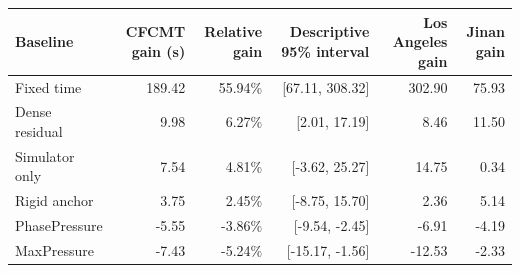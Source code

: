 \begin{tabular}{lrrrrr}
\toprule
Baseline & CFCMT gain (s) & Relative gain & Descriptive 95\% interval & Los Angeles gain & Jinan gain \\
\midrule
Fixed time & 189.42 & 55.94\% & [67.11, 308.32] & 302.90 & 75.93 \\
Dense residual & 9.98 & 6.27\% & [2.01, 17.19] & 8.46 & 11.50 \\
Simulator only & 7.54 & 4.81\% & [-3.62, 25.27] & 14.75 & 0.34 \\
Rigid anchor & 3.75 & 2.45\% & [-8.75, 15.70] & 2.36 & 5.14 \\
PhasePressure & -5.55 & -3.86\% & [-9.54, -2.45] & -6.91 & -4.19 \\
MaxPressure & -7.43 & -5.24\% & [-15.17, -1.56] & -12.53 & -2.33 \\
\bottomrule
\end{tabular}
